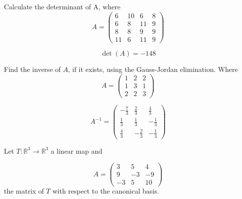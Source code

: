 \begin{questions}

\question Calculate the determinant of A, where
$$
A=\left(\begin{array}{rrrr}
6 & 10 & 6 & 8 \\
6 & 8 & 11 & 9 \\
8 & 8 & 9 & 9 \\
11 & 6 & 11 & 9
\end{array}\right)
$$

\begin{solution}
$$\det(A)=-148$$
\end{solution}

\question Find the inverse of $A$, if it exists, using the Gauss-Jordan elimination. Where
$$
A=\left(\begin{array}{rrr}
1 & 2 & 2 \\
1 & 3 & 1 \\
2 & 2 & 3
\end{array}\right)
$$

\begin{solution}
$$A^{-1}=\left(\begin{array}{rrr}
-\frac{7}{3} & \frac{2}{3} & \frac{4}{3} \\
\frac{1}{3} & \frac{1}{3} & -\frac{1}{3} \\
\frac{4}{3} & -\frac{2}{3} & -\frac{1}{3}
\end{array}\right)$$
\end{solution}

\question Let $T:\mathbb{R}^3\rightarrow\mathbb{R}^3$  a linear map and
 
$$
A=\left(\begin{array}{rrr}
3 & 5 & 4 \\
9 & -3 & -9 \\
-3 & 5 & 10
\end{array}\right)
$$
the matrix of $T$ with respect to the canonical basis.
\end{questions}
